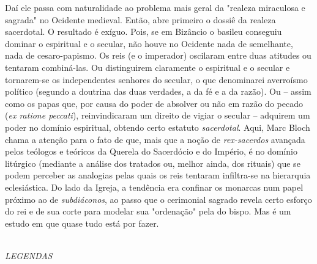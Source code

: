 \documentclass[a5paper]{book}
\begin{document}
Daí ele passa com naturalidade ao problema mais geral da "realeza miraculosa e sagrada" no Ocidente medieval. Então, abre primeiro o dossiê da realeza sacerdotal. O resultado é exíguo. Pois, se em Bizâncio o basileu conseguiu dominar o espiritual e o secular, não houve no Ocidente nada de semelhante, nada de cesaro-papismo. Os reis (e o imperador) oscilaram entre duas atitudes ou tentaram combiná-las. Ou distinguirem claramente o espiritual e o secular e tornarem-se os independentes senhores do secular, o que denominarei averroísmo político (segundo a doutrina das duas verdades, a da fé e a da razão). Ou -- assim como os papas que, por causa do poder de absolver ou não em razão do pecado (\textit{ex ratione peccati}), reinvindicaram um direito de vigiar o secular -- adquirem um poder no domínio espiritual, obtendo certo estatuto \textit{sacerdotal}. Aqui, Marc Bloch chama a atenção para o fato de que, mais que a noção de \textit{rex-sacerdos} avançada pelos teólogos e teóricos da Querela do Sacerdócio e do Império, é no domínio litúrgico (mediante a análise dos tratados ou, melhor ainda, dos rituais) que se podem perceber as analogias pelas quais os reis tentaram infiltra-se na hierarquia eclesiástica. Do lado da Igreja, a tendência era confinar os monarcas num papel próximo ao de \textit{subdiáconos}, ao passo que o cerimonial sagrado revela certo esforço do rei e de sua corte para modelar sua "ordenação" pela do bispo. Mas é um estudo em que quase tudo está por fazer.

~\\ \large \textit{LEGENDAS} ~\\
\end{document}
